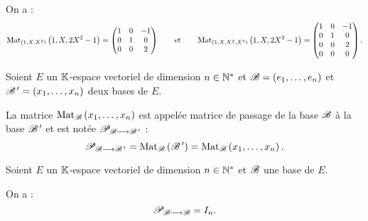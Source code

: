 \begin{corr}
On a : \[\Mat[\paren{1,X,X^2}]{1,X,2X^2-1}=\begin{pmatrix}
1 & 0 & -1 \\
0 & 1 & 0 \\
0 & 0 & 2
\end{pmatrix}\qquad\text{et}\qquad\Mat[\paren{1,X,X^2,X^3}]{1,X,2X^2-1}=\begin{pmatrix}
1 & 0 & -1 \\
0 & 1 & 0 \\
0 & 0 & 2 \\
0 & 0 & 0
\end{pmatrix}.\]
\end{corr}

\begin{defi}
Soient \(E\) un \(\mathbb{K}\)-espace vectoriel de dimension \(n\in\mathbb{N}^*\) et \(\mathscr{B}=\left(e_1,\dots,e_n\right)\) et \(\mathscr{B}^{\,\prime}=\left(x_1,\dots,x_n\right)\) deux bases de \(E\).

La matrice \(\Mat{x_1,\dots,x_n}\) est appelée matrice de passage de la base \(\mathscr{B}\) à la base \(\mathscr{B}^{\,\prime}\) et est notée \(\mathscr{P}_{\mathscr{B}\longrightarrow\mathscr{B}^{\,\prime}}\) : \[\pass{\fami{B}}{\fami{B}\prim}=\Mat{\fami{B}\prim}=\Mat{x_1,\dots,x_n}.\]
\end{defi}

\begin{rem}
Soient \(E\) un \(\mathbb{K}\)-espace vectoriel de dimension \(n\in\mathbb{N}^*\) et \(\mathscr{B}\) une base de \(E\).

On a : \[\mathscr{P}_{\mathscr{B}\longrightarrow\mathscr{B}}=I_n.\]
\end{rem}